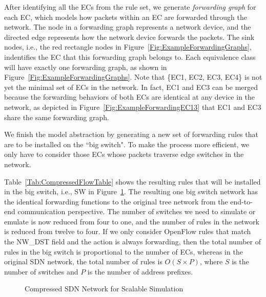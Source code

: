 After identifying all the ECs from the rule set, we generate \textit{forwarding graph} for each EC, which models how packets within an EC are forwarded through the network\cite{Veriflow}.
The node in a forwarding graph represents a network device, and the directed edge represents how the network device forwards the packets.
The sink nodes, i.e., the red rectangle nodes in Figure~\ref{Fig:ExampleForwardingGraphs}, indentifies the EC that this forwarding graph belongs to.
Each equivalence class will have exactly one forwarding graph, as shown in Figure~\ref{Fig:ExampleForwardingGraphs}.
Note that \{EC1, EC2, EC3, EC4\} is not yet the minimal set of ECs in the network.
In fact, EC1 and EC3 can be merged because the forwarding behaviors of both ECs are identical at any device in the network, as depicted in Figure~\ref{Fig:ExampleForwardingEC13} that EC1 and EC3 share the same forwarding graph.

We finish the model abstraction by generating a new set of forwarding rules that are to be installed on the ``big switch".
To make the process more efficient, we only have to consider those ECs whose packets traverse edge switches in the network.

Table~\ref{Tab:CompressedFlowTable} shows the resulting rules that will be installed in the big switch, i.e., SW in Figure~\ref{Fig:ExampleBigSwitch}.
The resulting one big switch network has the identical forwarding functions to the original tree network from the end-to-end communication perspective.
The number of switches we need to simulate or emulate is now reduced from four to one, and the number of rules in the network is reduced from twelve to four.
If we only consider OpenFlow rules that match the NW\_DST field and the action is always forwarding, then the total number of rules in the big switch is proportional to the number of ECs, whereas in the original SDN network, the total number of rules is $O(S\times P)$, where $S$ is the number of switches and $P$ is the number of address prefixes.

\begin{figure}[t]
\centering
{}
\caption{Compressed SDN Network for Scalable Simulation}
\label{Fig:ExampleBigSwitch}
\end{figure}
